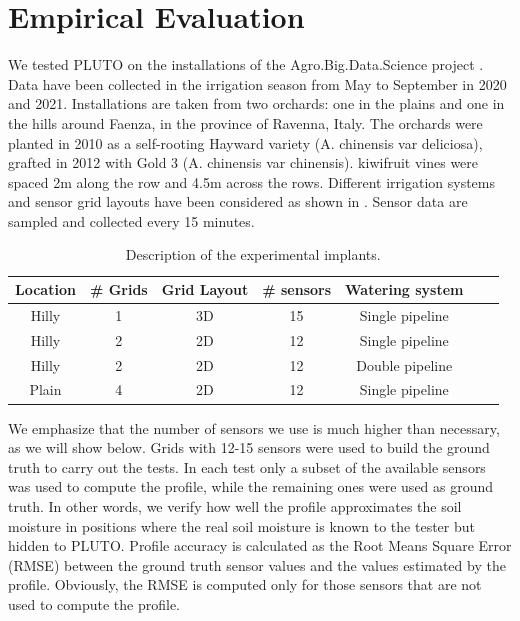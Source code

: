 \section{Empirical Evaluation}
\label{pluto-sec:ResultsAndDiscussion}
We tested PLUTO on the installations of the Agro.Big.Data.Science project \cite{ABDS}.
Data have been collected in the irrigation season from May to September in 2020 and 2021.
Installations are taken from two orchards: one in the plains and one in the hills around Faenza, in the province of Ravenna, Italy.
The orchards were planted in 2010 as a self-rooting Hayward variety (A. chinensis var deliciosa), grafted in 2012 with Gold 3 (A. chinensis var chinensis). 
kiwifruit vines were spaced 2m along the row and 4.5m across the rows.
Different irrigation systems and sensor grid layouts have been considered as shown in .
Sensor data are sampled and collected every 15 minutes. 
\begin{table}[t]
\centering
\begin{tabular}{@{}ccccccc@{}}
\toprule
Location & \# Grids & Grid Layout & \# sensors & Watering system \\ \midrule
Hilly & 1 & 3D & 15 & Single pipeline \\
Hilly & 2 & 2D & 12 & Single pipeline \\
Hilly & 2 & 2D & 12 & Double pipeline \\
Plain & 4 & 2D & 12 & Single pipeline \\ \bottomrule
\end{tabular}
\caption{Description of the experimental implants.}\label{pluto-tbl:implants}
\end{table}

We emphasize that the number of sensors we use is much higher than necessary, as we will show below. 
Grids with 12-15 sensors were used to build the ground truth to carry out the tests. In each test only a subset of the available sensors was used to compute the profile, while the remaining ones were used as ground truth. In other words, we verify how well the profile approximates the soil moisture in positions where the real soil moisture is known to the tester but hidden to PLUTO. Profile accuracy is calculated as the Root Means Square Error (RMSE) between the ground truth sensor values and the values estimated by the profile. Obviously, the RMSE is computed only for those sensors that are not used to compute the profile.

